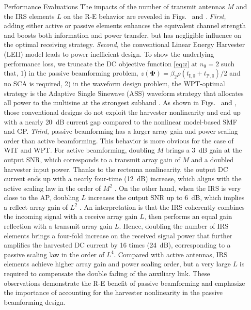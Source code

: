 \documentclass[journal]{IEEEtran}
\begin{document}
\begin{section}{Performance Evaluations}
		The impacts of the number of transmit antennas $M$ and the IRS elements $L$ on the R-E behavior are revealed in Figs.~ and . \emph{First,} adding either active or passive elements enhances the equivalent channel strength and boosts both information and power transfer, but has negligible influence on the optimal receiving strategy. \emph{Second,} the conventional Linear Energy Harvester (LEH) model leads to power-inefficient design. To show the underlying performance loss, we truncate the DC objective function \eqref{eq:z} at $n_0=2$ such that, 1) in the passive beamforming problem, $z(\boldsymbol{\Phi}) = {\beta_2}{\rho}(t_{\mathrm{I},0}+t_{\mathrm{P},0})/2$ and no SCA is required, 2) in the waveform design problem, the WPT-optimal strategy is the Adaptive Single Sinewave (ASS) waveform strategy that allocates all power to the multisine at the strongest subband \cite{Clerckx2016a}. As shown in Figs.~ and , those conventional designs do not exploit the harvester nonlinearity and end up with a nearly \SI{20}{\dB} current gap compared to the nonlinear model-based SMF and GP. \emph{Third,} passive beamforming has a larger array gain and power scaling order than active beamforming. This behavior is more obvious for the case of WIT and WPT. For active beamforming, doubling $M$ brings a \SI{3}{\dB} gain at the output SNR, which corresponds to a transmit array gain of $M$ \cite{Tse2005} and a doubled harvester input power. Thanks to the rectenna nonlinearity, the output DC current ends up with a nearly four-time (\SI{12}{\dB}) increase, which aligns with the active scaling law in the order of $M^2$ \cite{Clerckx2018b}. On the other hand, when the IRS is very close to the AP, doubling $L$ increases the output SNR up to \SI{6}{\dB}, which implies a reflect array gain of $L^2$ \cite{Wu2019}. An interpretation is that the IRS coherently combines the incoming signal with a receive array gain $L$, then performs an equal gain reflection with a transmit array gain $L$. Hence, doubling the number of IRS elements brings a four-fold increase on the received signal power that further amplifies the harvested DC current by \num{16} times (\SI{24}{\dB}), corresponding to a passive scaling law in the order of $L^4$. Compared with active antennas, IRS elements achieve higher array gain and power scaling order, but a very large $L$ is required to compensate the double fading of the auxiliary link. These observations demonstrate the R-E benefit of passive beamforming and emphasize the importance of accounting for the harvester nonlinearity in the passive beamforming design.


\end{section}
\end{document}
